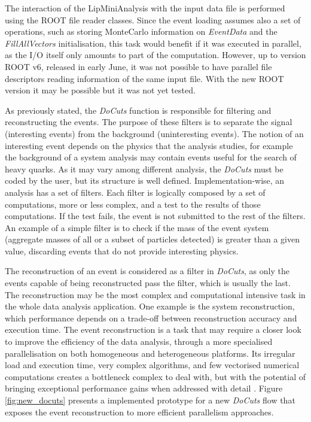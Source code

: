 The interaction of the LipMiniAnalysis with the input data file is performed using the ROOT file reader classes. Since the event loading assumes also a set of operations, such as storing MonteCarlo information on \textit{EventData} and the \textit{FillAllVectors} initialisation, this task would benefit if it was executed in parallel, as the I/O itself only amounts to part of the computation. However, up to version ROOT v6, released in early June, it was not possible to have parallel file descriptors reading information of the same input file. With the new ROOT version it may be possible but it was not yet tested.

As previously stated, the \textit{DoCuts} function is responsible for filtering and reconstructing the events. The purpose of these filters is to separate the signal (interesting events) from the background (uninteresting events). The notion of an interesting event depends on the physics that the analysis studies, for example the background of a \ttH system analysis may contain events useful for the search of heavy quarks. As it may vary among different analysis, the \textit{DoCuts} must be coded by the user, but its structure is well defined. Implementation-wise, an analysis has a set of filters. Each filter is logically composed by a set of computations, more or less complex, and a test to the results of those computations. If the test fails, the event is not submitted to the rest of the filters. An example of a simple filter is to check if the mass of the event system (aggregate masses of all or a subset of particles detected) is greater than a given value, discarding events that do not provide interesting physics.

The reconstruction of an event is considered as a filter in \textit{DoCuts}, as only the events capable of being reconstructed pass the filter, which is usually the last. The reconstruction may be the most complex and computational intensive task in the whole data analysis application. One example is the \ttH system reconstruction, which performance depends on a trade-off between reconstruction accuracy and execution time. The event reconstruction is a task that may require a closer look to improve the efficiency of the data analysis, through a more specialised parallelisation on both homogeneous and heterogeneous platforms. Its irregular load and execution time, very complex algorithms, and few vectorised numerical computations creates a bottleneck complex to deal with, but with the potential of bringing exceptional performance gains when addressed with detail \cite{paperAMP}. Figure \ref{fig:new_docuts} presents a implemented prototype for a new \textit{DoCuts} flow that exposes the event reconstruction to more efficient parallelism approaches.

